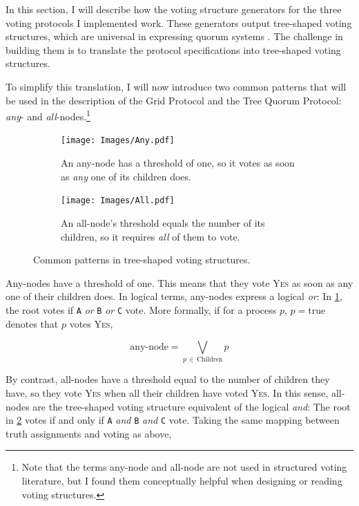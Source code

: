 \documentclass[12pt,chapterprefix=true,toc=bibliography,numbers=noendperiod,
               footnotes=multiple,twoside]{scrreprt}
\newcommand{\yes}{{\fontfamily{jkposn}\selectfont\textsc{Yes}}}
\begin{document}
In this section, I will describe how the voting structure generators for the three voting protocols I implemented work. These generators output tree-shaped voting structures, which are universal in expressing quorum systems \autocite{structures}. The challenge in building them is to translate the protocol specifications into tree-shaped voting structures.

To simplify this translation, I will now introduce two common patterns that will be used in the description of the Grid Protocol and the Tree Quorum Protocol: \emph{any}- and \emph{all}-nodes.\footnote{Note that the terms any-node and all-node are not used in structured voting literature, but I found them conceptually helpful when designing or reading voting structures.}

\begin{figure}[h]
    \centering
    \begin{subfigure}[t]{0.41\textwidth}
        \centering
        \texttt{[image: Images/Any.pdf]}
        \caption{An any-node has a threshold of one, so it votes as soon as \emph{any} one of its children does.}
        \label{fig:any}
    \end{subfigure}
    \quad
    \begin{subfigure}[t]{0.41\textwidth}
        \centering
        \texttt{[image: Images/All.pdf]}
        \caption{An all-node's threshold equals the number of its children, so it requires \emph{all} of them to vote.}
        \label{fig:all}
    \end{subfigure}
    \caption{Common patterns in tree-shaped voting structures.}
    \label{fig:tsvs-patterns}
\end{figure}

Any-nodes have a threshold of one. This means that they vote \yes{} as soon as any one of their children does. In logical terms, any-nodes express a logical \emph{or}: In \cref{fig:any}, the root votes if \texttt{A} \emph{or} \texttt{B} \emph{or} \texttt{C} vote. More formally, if for a process \(p\), \(p = \text{true}\) denotes that \(p\) votes \yes,

\[ \text{any-node} = \bigvee_{p\,\in\,\text{Children}} p \]

By contrast, all-nodes have a threshold equal to the number of children they have, so they vote \yes{} when all their children have voted \yes. In this sense, all-nodes are the tree-shaped voting structure equivalent of the logical \emph{and}: The root in \cref{fig:all} votes if and only if \texttt{A} \emph{and} \texttt{B} \emph{and} \texttt{C} vote. Taking the same mapping between truth assignments and voting as above,
\end{document}
